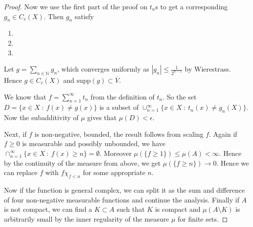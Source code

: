 \begin{proof}
  Now we use the first part of the proof on $t_n$s to get a
  corresponding $g_n \in C_c(X)$. Then $g_n$ satisfy
  \begin{enumerate}[label=(\arabic*)]
    \item
    \item
    \item
  \end{enumerate}
  Let $g = \sum_{n \in \mathbb{N}} g_n$, which converges uniformly as
  $|g_n| \le \frac{1}{2^{n-1}}$ by Wierestrass. Hence $g \in C_c(X)$
  and $  \textrm{supp}(g) \subset \overline{V}$.

  We know that $f = \sum_{n = 1}^{\infty}  t_n$  from
  the definition of $t_n$. So the set $D = \{ x \in X  \ : \  f(x)
  \neq g(x) \}$ is a subset of $\cup_{n = 1}^{\infty} \{ x \in X  \ :
  \ t_n(x) \neq g_n(X)  \}$. Now the subadditivity of $\mu$ gives
  that $\mu(D) < \epsilon$.

  Next, if $f$ is non-negative, bounded, the result follows from
  scaling $f$. Again if $f \ge 0$ is measurable and possibly
  unbounded, we have
  $\cap_{n = 1}^{\infty} \{ x \in X  \ : \  f(x) \ge n \} =
  \emptyset$. Moreover $\mu(\{ f \ge 1 \}) \le \mu(A) < \infty$.
  Hence by the continuity of the measure from above, we get $\mu(\{ f
  \ge n \}) \to 0$. Hence we can replace $f$ with $f \chi_{f< n}$ for
  some appropriate $n$.

  Now if the function is general complex, we can split it as the sum
  and difference of four non-negative measurable functions and
  continue the analysis. Finally if $A$ is not compact, we can find a
  $K \subset A$ such that $ K$ is compact and $\mu(A \setminus K)$ is
  arbitrarily small by the inner regularity of the measure $\mu$ for
  finite sets.
\end{proof}



